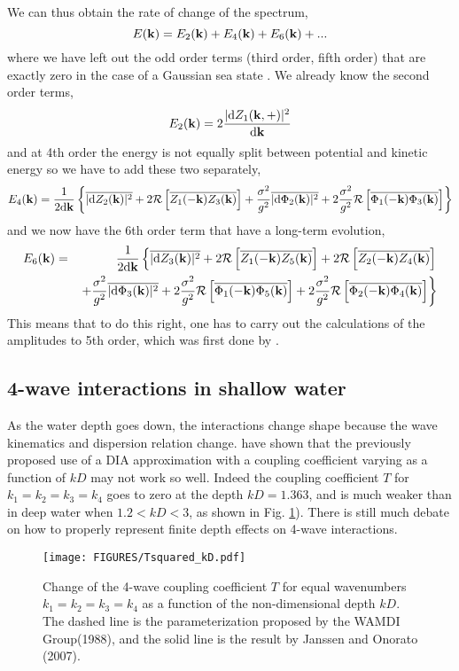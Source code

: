We can thus obtain the rate of change of the spectrum, 
\begin{equation}
 E(\mathbf{k})=E_2(\mathbf{k}) + E_4(\mathbf{k}) + E_6(\mathbf{k}) + ...
\end{equation}
where we have left out the odd order terms (third order, fifth order) that are exactly zero in the case of a Gaussian sea state \citep{Hasselmann1962}.
We already know the second order terms, 
\begin{equation}
E_2(\mathbf{k})=2 \frac{|\mathrm{d} Z_1(\mathbf{k},+)|^2}{\mathrm{d} \mathbf{k}} 
\end{equation}
and at 4th order the energy is not equally split between potential and kinetic energy so we have to add these two separately, 
\begin{equation}
 E_4(\mathbf{k})=\frac{1}{2 \mathrm{d} \mathbf{k}}\left\{\overline{|\mathrm{d} Z_2(\mathbf{k})|^2} + 2 {\cal R}\left[\overline{Z_1(-\mathbf{k}) Z_3(\mathbf{k})}\right]
+ \frac{\sigma^2}{g^2}\overline{|\mathrm{d} \Phi_2(\mathbf{k})|^2} + 2 \frac{\sigma^2}{g^2}{\cal R}\left[\overline{\Phi_1(-\mathbf{k}) \Phi_3(\mathbf{k})}\right] \right\}
\end{equation}
and we now have the 6th order term that have a long-term evolution, 
\begin{eqnarray}
 E_6(\mathbf{k})&=&\frac{1}{2 \mathrm{d} \mathbf{k}}\left\{\overline{|\mathrm{d} Z_3(\mathbf{k})|^2} + 2 {\cal R}\left[\overline{Z_1(-\mathbf{k}) Z_5(\mathbf{k})}\right] + 
2 {\cal R}\left[\overline{Z_2(-\mathbf{k}) Z_4(\mathbf{k})}\right] \right. \nonumber \\
& &\left.
+ \frac{\sigma^2}{g^2}\overline{|\mathrm{d} \Phi_3(\mathbf{k})|^2} + 2 \frac{\sigma^2}{g^2}{\cal R}\left[\overline{\Phi_1(-\mathbf{k}) \Phi_5(\mathbf{k})}\right] 
+ 2 \frac{\sigma^2}{g^2}{\cal R}\left[\overline{\Phi_2(-\mathbf{k}) \Phi_4(\mathbf{k})}\right] \right\}\label{E6}
\end{eqnarray}
This means that to do this right, one has to carry out the calculations of the amplitudes to 5th order, which was first done by \cite{Hasselmann1962}.

\subsection{4-wave interactions in shallow water}
As the water depth goes down, the interactions change shape because the wave kinematics and dispersion relation change. \citep{Janssen&Onorato2007} have shown that the previously proposed use of a DIA approximation with a coupling coefficient varying as a function of $kD$  may not work so well. 
Indeed the coupling coefficient $T$ for $k_1=k_2=k_3=k_4$ goes to zero at the depth $kD=1.363$, and is much weaker than in deep water when $1.2 < kD < 3$, as shown in Fig. 
\ref{T2_Snl_vs_KD}). There is still much debate on how to properly represent finite depth effects on 4-wave interactions. 
\begin{figure}
\centerline{\texttt{[image: FIGURES/Tsquared\_kD.pdf]}}
\caption{Change of the 4-wave coupling coefficient $T$ for equal wavenumbers  $k_1=k_2=k_3=k_4$ as a function of the non-dimensional depth $kD$. The dashed line is the parameterization proposed by the WAMDI Group(1988), and the solid line is the result by Janssen and Onorato (2007).} \label{T2_Snl_vs_KD}
\end{figure}
